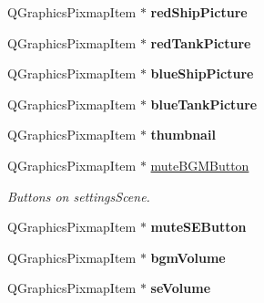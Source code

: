 \begin{DoxyCompactItemize}
\item 
Q\+Graphics\+Pixmap\+Item $\ast$ {\bfseries red\+Ship\+Picture}\hypertarget{class_game_menu_ae84c38f6ebfb2e3ff1706cbc68486664}{}\label{class_game_menu_ae84c38f6ebfb2e3ff1706cbc68486664}

\item 
Q\+Graphics\+Pixmap\+Item $\ast$ {\bfseries red\+Tank\+Picture}\hypertarget{class_game_menu_a45bc69ba75f458e21d7f3a1ea63dd666}{}\label{class_game_menu_a45bc69ba75f458e21d7f3a1ea63dd666}

\item 
Q\+Graphics\+Pixmap\+Item $\ast$ {\bfseries blue\+Ship\+Picture}\hypertarget{class_game_menu_ad46b5b1b90f4d0ce99790c8bc9d7832c}{}\label{class_game_menu_ad46b5b1b90f4d0ce99790c8bc9d7832c}

\item 
Q\+Graphics\+Pixmap\+Item $\ast$ {\bfseries blue\+Tank\+Picture}\hypertarget{class_game_menu_af70e2733344a7eeb1678c2666e3eb164}{}\label{class_game_menu_af70e2733344a7eeb1678c2666e3eb164}

\item 
Q\+Graphics\+Pixmap\+Item $\ast$ {\bfseries thumbnail}\hypertarget{class_game_menu_ab8ec0b01e303715a988e5e51cccb14de}{}\label{class_game_menu_ab8ec0b01e303715a988e5e51cccb14de}

\item 
Q\+Graphics\+Pixmap\+Item $\ast$ \hyperlink{class_game_menu_aaf654b46140ebb546578a3fefd72934c}{mute\+B\+G\+M\+Button}\hypertarget{class_game_menu_aaf654b46140ebb546578a3fefd72934c}{}\label{class_game_menu_aaf654b46140ebb546578a3fefd72934c}

\begin{DoxyCompactList}\small\item\em Buttons on settings\+Scene. \end{DoxyCompactList}\item 
Q\+Graphics\+Pixmap\+Item $\ast$ {\bfseries mute\+S\+E\+Button}\hypertarget{class_game_menu_a23666659fe3b9f0642fd53d308e9a8e0}{}\label{class_game_menu_a23666659fe3b9f0642fd53d308e9a8e0}

\item 
Q\+Graphics\+Pixmap\+Item $\ast$ {\bfseries bgm\+Volume}\hypertarget{class_game_menu_a693030c5c46cdb795d89879a2a362cc2}{}\label{class_game_menu_a693030c5c46cdb795d89879a2a362cc2}

\item 
Q\+Graphics\+Pixmap\+Item $\ast$ {\bfseries se\+Volume}\hypertarget{class_game_menu_a321abee561f05b81fb6e6570ce0b3203}{}\label{class_game_menu_a321abee561f05b81fb6e6570ce0b3203}


\end{DoxyCompactItemize}
